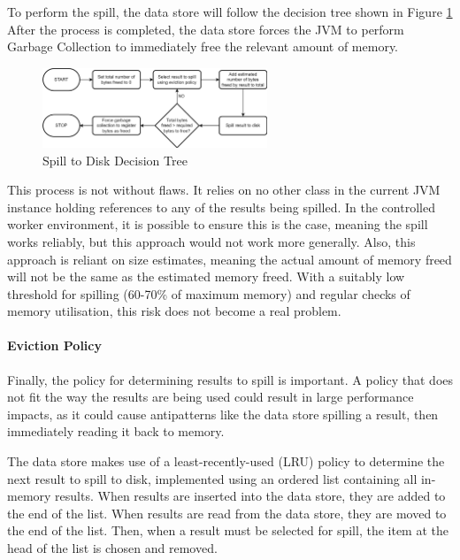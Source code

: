 To perform the spill, the data store will follow the decision tree shown in Figure \ref{fig:spill-to-disk-process} After the process is completed, the data store forces the JVM to perform Garbage Collection to immediately free the relevant amount of memory.

\begin{figure}[h]
	\centering
	\includegraphics[width=0.6\textwidth]{chapters/diagrams/implementation/spill-to-disk-process}
	\caption{Spill to Disk Decision Tree}
	\label{fig:spill-to-disk-process}
\end{figure}

This process is not without flaws. It relies on no other class in the current JVM instance holding references to any of the results being spilled. In the controlled worker environment, it is possible to ensure this is the case, meaning the spill works reliably, but this approach would not work more generally. Also, this approach is reliant on size estimates, meaning the actual amount of memory freed will not be the same as the estimated memory freed. With a suitably low threshold for spilling (60-70\% of maximum memory) and regular checks of memory utilisation, this risk does not become a real problem.

\paragraph{Eviction Policy}
Finally, the policy for determining results to spill is important. A policy that does not fit the way the results are being used could result in large performance impacts, as it could cause antipatterns like the data store spilling a result, then immediately reading it back to memory.

The data store makes use of a least-recently-used (LRU) policy to determine the next result to spill to disk, implemented using an ordered list containing all in-memory results. When results are inserted into the data store, they are added to the end of the list. When results are read from the data store, they are moved to the end of the list. Then, when a result must be selected for spill, the item at the head of the list is chosen and removed.



